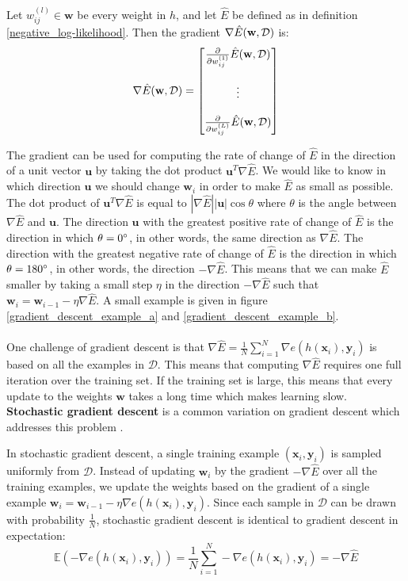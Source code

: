 \begin{definition}[gradient]
	\label{gradient}
	Let $w^{(l)}_{ij} \in \mathbf{w}$ be every weight in $h$, and let $\hat{E}$ be defined as in definition \ref{negative_log-likelihood}. Then the gradient $\nabla \hat{E}(\mathbf{w}, \mathcal{D})$ is:
	$$
	\nabla \hat{E}(\mathbf{w}, \mathcal{D}) = \begin{bmatrix} \frac{\partial}{\partial w^{(1)}_{ij}}\hat{E}(\mathbf{w}, \mathcal{D}) \\ \\ \vdots \\ \\ \frac{\partial}{\partial w^{(L)}_{ij}}\hat{E}(\mathbf{w}, \mathcal{D})\end{bmatrix}
	$$
\end{definition}
\noindent
The gradient can be used for computing the rate of change of $\hat{E}$ in the direction of a unit vector $\mathbf{u}$ by taking the dot product $\mathbf{u}^T\nabla \hat{E}$. We would like to know in which direction $\mathbf{u}$ we should change $\mathbf{w}_i$ in order to make $\hat{E}$ as small as possible. The dot product of $\mathbf{u}^T\nabla \hat{E}$ is equal to $|\nabla \hat{E}||\mathbf{u}|\cos \theta$ where $\theta$ is the angle between $\nabla \hat{E}$ and $\mathbf{u}$. The direction $\mathbf{u}$ with the greatest positive rate of change of $\hat{E}$ is the direction in which $\theta = 0\degree$, in other words, the same direction as $\nabla \hat{E}$. The direction with the greatest negative rate of change of $\hat{E}$ is the direction in which $\theta = 180\degree$, in other words, the direction $-\nabla \hat{E}$. This means that we can make $\hat{E}$ smaller by taking a small step $\eta$ in the direction $-\nabla \hat{E}$ such that $\mathbf{w}_i = \mathbf{w}_{i-1} - \eta\nabla\hat{E}$. A small example is given in figure \ref{gradient_descent_example_a} and \ref{gradient_descent_example_b}.
\\\\
One challenge of gradient descent is that $\nabla \hat{E} = \frac{1}{N}\sum_{i=1}^N\nabla e(h(\mathbf{x}_i), \mathbf{y}_i)$ is based on all the examples in $\mathcal{D}$. This means that computing $\nabla \hat{E}$ requires one full iteration over the training set. If the training set is large, this means that every update to the weights $\mathbf{w}$ takes a long time which makes learning slow. \textbf{Stochastic gradient descent} is a common variation on gradient descent which addresses this problem \citep{yaser12}. 

In stochastic gradient descent, a single training example $(\mathbf{x}_i, \mathbf{y}_i)$ is sampled uniformly from $\mathcal{D}$. Instead of updating $\mathbf{w}_i$ by the gradient $-\nabla \hat{E}$ over all the training examples, we update the weights based on the gradient of a single example $\mathbf{w}_i = \mathbf{w}_{i-1}-\eta\nabla e(h(\mathbf{x}_i), \mathbf{y}_i)$. Since each sample in $\mathcal{D}$ can be drawn with probability $\frac{1}{N}$, stochastic gradient descent is identical to gradient descent in expectation:
$$
\mathbb{E}(-\nabla e(h(\mathbf{x}_i), \mathbf{y}_i)) = \frac{1}{N}\sum\limits_{i=1}^N -\nabla e(h(\mathbf{x}_i), \mathbf{y}_i) = -\nabla\hat{E}
$$

